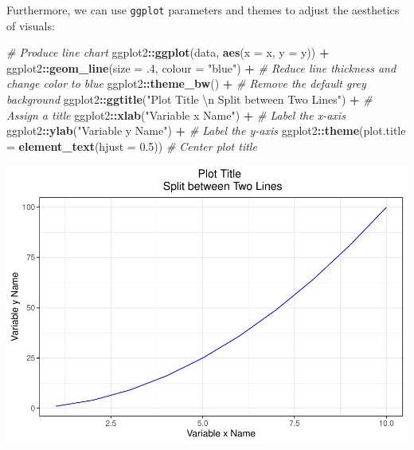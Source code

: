 \documentclass[]{book}
\newenvironment{Shaded}{\begin{snugshade}}{\end{snugshade}}
\newcommand{\CharTok}[1]{\textcolor[rgb]{0.31,0.60,0.02}{#1}}
\newcommand{\CommentTok}[1]{\textcolor[rgb]{0.56,0.35,0.01}{\textit{#1}}}
\newcommand{\DataTypeTok}[1]{\textcolor[rgb]{0.13,0.29,0.53}{#1}}
\newcommand{\FloatTok}[1]{\textcolor[rgb]{0.00,0.00,0.81}{#1}}
\newcommand{\KeywordTok}[1]{\textcolor[rgb]{0.13,0.29,0.53}{\textbf{#1}}}
\newcommand{\NormalTok}[1]{#1}
\newcommand{\OperatorTok}[1]{\textcolor[rgb]{0.81,0.36,0.00}{\textbf{#1}}}
\newcommand{\StringTok}[1]{\textcolor[rgb]{0.31,0.60,0.02}{#1}}
\begin{document}
Furthermore, we can use \texttt{ggplot} parameters and themes to adjust the aesthetics of visuals:

\begin{Shaded}
\begin{Highlighting}[]
\CommentTok{# Produce line chart}
\NormalTok{ggplot2}\OperatorTok{::}\KeywordTok{ggplot}\NormalTok{(data, }\KeywordTok{aes}\NormalTok{(}\DataTypeTok{x =}\NormalTok{ x, }\DataTypeTok{y =}\NormalTok{ y)) }\OperatorTok{+}
\NormalTok{ggplot2}\OperatorTok{::}\KeywordTok{geom_line}\NormalTok{(}\DataTypeTok{size =} \FloatTok{.4}\NormalTok{, }\DataTypeTok{colour =} \StringTok{"blue"}\NormalTok{) }\OperatorTok{+}\StringTok{ }\CommentTok{# Reduce line thickness and change color to blue}
\NormalTok{ggplot2}\OperatorTok{::}\KeywordTok{theme_bw}\NormalTok{() }\OperatorTok{+}\StringTok{ }\CommentTok{# Remove the default grey background}
\NormalTok{ggplot2}\OperatorTok{::}\KeywordTok{ggtitle}\NormalTok{(}\StringTok{"Plot Title }\CharTok{\textbackslash{}n}\StringTok{ Split between Two Lines"}\NormalTok{) }\OperatorTok{+}\StringTok{ }\CommentTok{# Assign a title}
\NormalTok{ggplot2}\OperatorTok{::}\KeywordTok{xlab}\NormalTok{(}\StringTok{"Variable x Name"}\NormalTok{) }\OperatorTok{+}\StringTok{ }\CommentTok{# Label the x-axis}
\NormalTok{ggplot2}\OperatorTok{::}\KeywordTok{ylab}\NormalTok{(}\StringTok{"Variable y Name"}\NormalTok{) }\OperatorTok{+}\StringTok{ }\CommentTok{# Label the y-axis}
\NormalTok{ggplot2}\OperatorTok{::}\KeywordTok{theme}\NormalTok{(}\DataTypeTok{plot.title =} \KeywordTok{element_text}\NormalTok{(}\DataTypeTok{hjust =} \FloatTok{0.5}\NormalTok{)) }\CommentTok{# Center plot title}
\end{Highlighting}
\end{Shaded}

\includegraphics{The_People_Analytics_Companion_files/figure-latex/unnamed-chunk-52-1.pdf}
\end{document}
